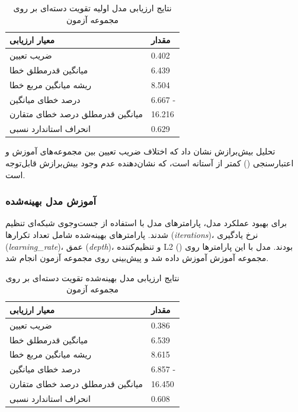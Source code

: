 \vspace{0.3cm}
\begin{table}[H]
	\centering
	\caption{نتایج ارزیابی مدل اولیه تقویت دسته‌ای بر روی مجموعه آزمون}
	\renewcommand{\arraystretch}{1.3}
	\begin{tabular}{
			>{\centering\arraybackslash}m{4cm}
			>{\centering\arraybackslash}m{3cm}
		}
		\toprule
		\textbf{معیار ارزیابی} & \textbf{مقدار} \\
		\midrule
		ضریب تعیین & \num{0.402} \\
		میانگین قدرمطلق خطا & \num{6.439} \\
		ریشه میانگین مربع خطا & \num{8.504} \\
		درصد خطای میانگین & \num{6.667} - \\
		میانگین قدرمطلق درصد خطای متقارن & \num{16.216} \\
		انحراف استاندارد نسبی & \num{0.629} \\
		\bottomrule
	\end{tabular}
	\label{tab:catboost_initial}
\end{table}
\vspace{0.5cm}

تحلیل بیش‌برازش نشان داد که اختلاف ضریب تعیین بین مجموعه‌های آموزش و اعتبارسنجی (\texttt{}) کمتر از آستانه \texttt{} است، که نشان‌دهنده عدم وجود بیش‌برازش قابل‌توجه است.

\subsubsection{آموزش مدل بهینه‌شده}

برای بهبود عملکرد مدل، پارامترهای مدل با استفاده از جست‌وجوی شبکه‌ای تنظیم شدند. پارامترهای بهینه‌شده شامل تعداد تکرارها (\textit{iterations})، نرخ یادگیری (\textit{learning\_rate})، عمق (\textit{depth})، و تنظیم‌کننده L2 () بودند. مدل با این پارامترها روی مجموعه آموزش آموزش داده شد و پیش‌بینی روی مجموعه آزمون انجام شد.

\vspace{0.3cm}
\begin{table}[H]
	\centering
	\caption{نتایج ارزیابی مدل بهینه‌شده تقویت دسته‌ای بر روی مجموعه آزمون}
	\renewcommand{\arraystretch}{1.3}
	\begin{tabular}{
			>{\centering\arraybackslash}m{4cm}
			>{\centering\arraybackslash}m{3cm}
		}
		\toprule
		\textbf{معیار ارزیابی} & \textbf{مقدار} \\
		\midrule
		ضریب تعیین & \num{0.386} \\
		میانگین قدرمطلق خطا & \num{6.539} \\
		ریشه میانگین مربع خطا & \num{8.615} \\
		درصد خطای میانگین & \num{6.857} - \\
		میانگین قدرمطلق درصد خطای متقارن & \num{16.450} \\
		انحراف استاندارد نسبی & \num{0.608} \\
		\bottomrule
	\end{tabular}
	\label{tab:catboost_tuned}
\end{table}
\vspace{0.5cm}

